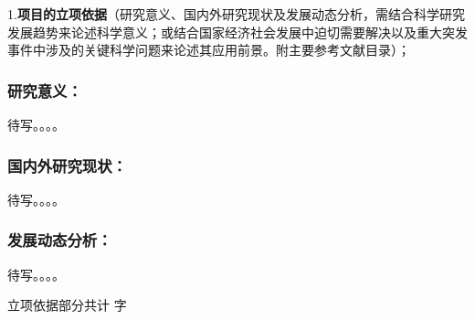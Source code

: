 {\sihao \kaishu \color{MsBlue} 1.{\bfseries 项目的立项依据}（研究意义、国内外研究现状及发展动态分析，需结合科学研究发展趋势来论述科学意义；或结合国家经济社会发展中迫切需要解决以及重大突发事件中涉及的关键科学问题来论述其应用前景。附主要参考文献目录）；}

\vskip 2mm
\subsubsection{\bfseries 研究意义：}

待写。。。。


\subsubsection{\bfseries 国内外研究现状：}

待写。。。。


\subsubsection{\bfseries 发展动态分析：}

待写。。。。


\ifhandout
\else
\begin{center}
{\larger[2]\color{red}  立项依据部分共计 \wordcount 字 }
\end{center}
\fi


\vskip 5mm



%
% 
% 
\printbibliography[title=参考文献]
